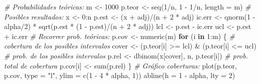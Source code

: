 \documentclass[
]{book}
\newenvironment{Shaded}{\begin{snugshade}}{\end{snugshade}}
\newcommand{\AttributeTok}[1]{\textcolor[rgb]{0.77,0.63,0.00}{#1}}
\newcommand{\CommentTok}[1]{\textcolor[rgb]{0.56,0.35,0.01}{\textit{#1}}}
\newcommand{\ControlFlowTok}[1]{\textcolor[rgb]{0.13,0.29,0.53}{\textbf{#1}}}
\newcommand{\DecValTok}[1]{\textcolor[rgb]{0.00,0.00,0.81}{#1}}
\newcommand{\FunctionTok}[1]{\textcolor[rgb]{0.00,0.00,0.00}{#1}}
\newcommand{\NormalTok}[1]{#1}
\newcommand{\OtherTok}[1]{\textcolor[rgb]{0.56,0.35,0.01}{#1}}
\newcommand{\SpecialCharTok}[1]{\textcolor[rgb]{0.00,0.00,0.00}{#1}}
\newcommand{\StringTok}[1]{\textcolor[rgb]{0.31,0.60,0.02}{#1}}
\theoremstyle{break}
\theoremstyle{definition}
\theoremstyle{definition}
\theoremstyle{definition}
\theoremstyle{definition}
\theoremstyle{remark}
\begin{document}
\begin{enumerate}
\begin{Shaded}
\begin{Highlighting}[]
\CommentTok{\# Probabilidades teóricas:}
\NormalTok{m }\OtherTok{\textless{}{-}} \DecValTok{1000}
\NormalTok{p.teor }\OtherTok{\textless{}{-}} \FunctionTok{seq}\NormalTok{(}\DecValTok{1}\SpecialCharTok{/}\NormalTok{n, }\DecValTok{1} \SpecialCharTok{{-}} \DecValTok{1}\SpecialCharTok{/}\NormalTok{n, }\AttributeTok{length =}\NormalTok{ m) }
\CommentTok{\# Posibles resultados:}
\NormalTok{x }\OtherTok{\textless{}{-}} \DecValTok{0}\SpecialCharTok{:}\NormalTok{n}
\NormalTok{p.est }\OtherTok{\textless{}{-}}\NormalTok{ (x }\SpecialCharTok{+}\NormalTok{ adj)}\SpecialCharTok{/}\NormalTok{(n }\SpecialCharTok{+} \DecValTok{2} \SpecialCharTok{*}\NormalTok{ adj) }
\NormalTok{ic.err }\OtherTok{\textless{}{-}} \FunctionTok{qnorm}\NormalTok{(}\DecValTok{1} \SpecialCharTok{{-}}\NormalTok{ alpha}\SpecialCharTok{/}\DecValTok{2}\NormalTok{) }\SpecialCharTok{*} \FunctionTok{sqrt}\NormalTok{(p.est }\SpecialCharTok{*}\NormalTok{ (}\DecValTok{1} \SpecialCharTok{{-}}\NormalTok{ p.est)}\SpecialCharTok{/}\NormalTok{(n }\SpecialCharTok{+} \DecValTok{2} \SpecialCharTok{*}\NormalTok{ adj))  }
\NormalTok{lcl }\OtherTok{\textless{}{-}}\NormalTok{ p.est }\SpecialCharTok{{-}}\NormalTok{ ic.err }
\NormalTok{ucl }\OtherTok{\textless{}{-}}\NormalTok{ p.est }\SpecialCharTok{+}\NormalTok{ ic.err }
\CommentTok{\# Recorrer prob. teóricas:}
\NormalTok{p.cov }\OtherTok{\textless{}{-}} \FunctionTok{numeric}\NormalTok{(m)}
\ControlFlowTok{for}\NormalTok{ (i }\ControlFlowTok{in} \DecValTok{1}\SpecialCharTok{:}\NormalTok{m) \{}
  \CommentTok{\# cobertura de los posibles intervalos}
\NormalTok{  cover }\OtherTok{\textless{}{-}}\NormalTok{ (p.teor[i] }\SpecialCharTok{\textgreater{}=}\NormalTok{ lcl) }\SpecialCharTok{\&}\NormalTok{ (p.teor[i] }\SpecialCharTok{\textless{}=}\NormalTok{ ucl)  }
  \CommentTok{\# prob. de los posibles intervalos}
\NormalTok{  p.rel }\OtherTok{\textless{}{-}} \FunctionTok{dbinom}\NormalTok{(x[cover], n, p.teor[i])           }
  \CommentTok{\# prob. total de cobertura}
\NormalTok{  p.cov[i] }\OtherTok{\textless{}{-}} \FunctionTok{sum}\NormalTok{(p.rel)                            }
\NormalTok{\}}
\CommentTok{\# Gráfico coberturas:}
\FunctionTok{plot}\NormalTok{(p.teor, p.cov, }\AttributeTok{type =} \StringTok{"l"}\NormalTok{, }\AttributeTok{ylim =} \FunctionTok{c}\NormalTok{(}\DecValTok{1} \SpecialCharTok{{-}} \DecValTok{4} \SpecialCharTok{*}\NormalTok{ alpha, }\DecValTok{1}\NormalTok{))}
\FunctionTok{abline}\NormalTok{(}\AttributeTok{h =} \DecValTok{1} \SpecialCharTok{{-}}\NormalTok{ alpha, }\AttributeTok{lty =} \DecValTok{2}\NormalTok{) }
\end{Highlighting}
\end{Shaded}


\end{enumerate}
\end{document}
